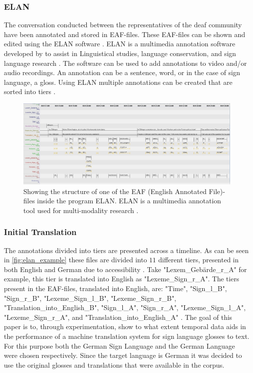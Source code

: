 \subsubsection{ELAN}
The conversation conducted between the representatives of the deaf community have been annotated and stored in EAF-files. These EAF-files can be shown and edited using the ELAN software \cite{crasborn2008enhanced}. ELAN is a multimedia annotation software developed by \citep{elan_software} to assist in Linguistical studies, language conservation, and sign language research \cite{brugman2004annotating}. The software can be used to add annotations to video and/or audio recordings. An annotation can be a sentence, word, or in the case of sign language, a gloss. Using ELAN multiple annotations can be created that are sorted into tiers \cite{crasborn2008enhanced}.  

\begin{figure}[h]
 \centering 
 \includegraphics[width=14cm]{Bachelor CSAI thesis template/images/ELAN_example.jpg}
 \caption{Showing the structure of one of the EAF (English Annotated File)-files \cite{elan_example} inside the program ELAN. ELAN is a multimedia annotation tool used for multi-modality research \cite{sloetjes2017elan}. }
 \label{fig:elan_example}
\end{figure}

\subsubsection{Initial Translation}

The annotations divided into tiers are presented across a timeline. As can be seen in \autoref{fig:elan_example} these files are divided into $11$ different tiers, presented in both English and German due to accessibility \cite{konradoffentliches}. Take "Lexem\_Gebärde\_r\_A" for example, this tier is translated into English as "Lexeme\_Sign\_r\_A". The tiers present in the EAF-files, translated into English, are: "Time", "Sign\_l\_B", "Sign\_r\_B", "Lexeme\_Sign\_l\_B", "Lexeme\_Sign\_r\_B", 
"Translation\_into\_English\_B", "Sign\_l\_A", "Sign\_r\_A", "Lexeme\_Sign\_l\_A", "Lexeme\_Sign\_r\_A", and "Translation\_into\_English\_A" \cite{sloetjes2017elan}. The goal of this paper is to, through experimentation, show to what extent temporal data aids in the performance of a machine translation system for sign language glosses to text. For this purpose both the German Sign Language and the German Language were chosen respectively. Since the target language is German it was decided to use the original glosses and translations that were available in the corpus.

